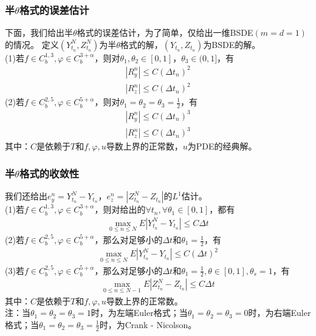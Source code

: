 		\subsubsection{半$\theta$格式的误差估计}
			\par
			下面，我们给出半$\theta$格式的误差估计，为了简单，仅给出一维BSDE$(m=d=1)$的情况。
			定义$(Y_{t_n}^N,Z_{t_n}^N)$为半$\theta$格式的解，$(Y_{t_n},Z_{t_n})$为BSDE的解。\\
			\noindent (1)若$f \in C_b^{1,3},\varphi \in C_b^{3+\alpha}$，则对$\theta_1,\theta_2 \in [0,1]$，$\theta_3 \in (0,1]$，有
					\begin{align*}
					{\left| {R_y^n} \right| \leqslant C{{\left( {\Delta {t_n}} \right)}^2}}\\
					{\left| {R_z^n} \right| \leqslant C{{\left( {\Delta {t_n}} \right)}^2}}
					\end{align*}
			 \noindent (2)若$f \in C_b^{2,5},\varphi \in C_b^{5+\alpha}$，则对$\theta_1=\theta_2 =\theta_3 =\frac 12$，有
					\begin{align*}
					{\left| {R_y^n} \right| \leqslant C{{\left( {\Delta {t_n}} \right)}^3}}\\
					{\left| {R_z^n} \right| \leqslant C{{\left( {\Delta {t_n}} \right)}^3}}
					\end{align*}
			 其中：$C$是依赖于$T$和$f,\varphi,u$导数上界的正常数，$u$为PDE的经典解。%
		\subsubsection{半$\theta$格式的收敛性}
			我们还给出$e_y^n=Y_{t_n}^N-Y_{t_n}$，$e_z^n=|{Z_{t_n}^N}-{Z_{t_n}}|$的$L^{1}$估计。\\
			\noindent (1)若$f \in C_b^{1,3},\varphi \in C_b^{3+\alpha}$，则对给出的$\forall t_n,\forall \theta_1\in [0,1]$，都有
			\begin{align*}
			\mathop {\max }\limits_{0 \leqslant n \leqslant N}E|Y_{t_n}^N-Y_{t_n}| \leqslant C\Delta {t} \end{align*}
			 \noindent (2)若$f \in C_b^{2,5},\varphi \in C_b^{5+\alpha}$，那么对足够小的$\Delta {t}$和$\theta_1=\frac 12$，有
			\begin{align*}
			{\mathop {\max }\limits_{0 \leqslant n \leqslant N}}E|Y_{t_n}^N-Y_{t_n}| \leqslant C(\Delta {t})^2 \end{align*}
			 \noindent (3)若$f \in C_b^{2,5},\varphi \in C_b^{5+\alpha}$，那么对足够小的$\Delta {t}$和$\theta_1=\frac 12,\theta \in [0,1],\theta_s=1$，有
			\begin{align*}
			\mathop {\max }\limits_{0 \leqslant n \leqslant {N-1}}E|Z_{t_n}^N-Z_{t_n}| \leqslant C\Delta {t} \end{align*}
			其中：$C$是依赖于$T$和$f,\varphi,u$导数上界的正常数。\\
			注：当$\theta_1 = \theta_2 = \theta_3 = 1$时，为左端Euler格式；当$\theta_1 = \theta_2 = \theta_3 = 0$时，为右端Euler格式；当$\theta_1 = \theta_2 = \theta_3 = \frac{1}{2}$时，为Crank - Nicolson。
